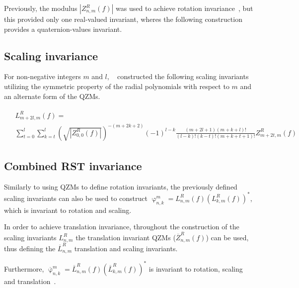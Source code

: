 Previously, the modulus $|Z_{n,m}^R(f)|$ was used to achieve rotation invariance~\cite{qzm}, but this provided only one real-valued invariant, wheres the following construction provides a quaternion-values invariant.

\subsection{Scaling invariance}
For non-negative integers $m$ and $l$, \citeauthor{qzmi}~\cite{qzmi} constructed the following scaling invariants utilizing the symmetric property of the radial polynomials with respect to $m$ and an alternate form of the QZMs.

\begin{gather*}
  \begin{split}
  &L_{m + 2l,m}^R(f) = \\ 
  &\sum_{t=0}^l\sum_{k=t}^l\left(\sqrt{|Z_{0,0}^R(f)|}\right)^{-(m+2k+2)}(-1)^{l-k}\frac{(m + 2l + 1)(m + k + l)!}{(l - k)!(k - t)!(m + k + t + 1)!}Z_{m+2t,m}^R(f)
  \end{split}
\end{gather*}

\subsection{Combined RST invariance}
Similarly to using QZMs to define rotation invariants, the previously defined scaling invariants can also be used to construct $\upvarphi_{n,k}^m = L_{n,m}^R(f)(L_{k,m}^R(f))^*$, which is invariant to rotation and scaling.

In order to achieve translation invariance, throughout the construction of the scaling invariants $L_{n,m}^R$ the translation invariant QZMs ($\overline{Z}_{n,m}^R(f)$) can be used, thus defining the $\overline{L}_{n,m}^R$ translation and scaling invariants.

Furthermore, $\overline{\upvarphi}_{n,k}^m = \overline{L}_{n,m}^R(f)(\overline{L}_{k,m}^R(f))^*$ is invariant to rotation, scaling and translation~\cite{qzmi}.
